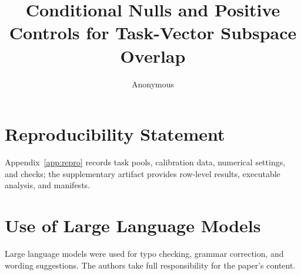 \documentclass{article}
\title{Conditional Nulls and Positive Controls for Task-Vector Subspace Overlap}
\author{Anonymous}
\begin{document}
\maketitle







\section*{Reproducibility Statement}
Appendix~\ref{app:repro} records task pools, calibration data, numerical settings, and checks;
the supplementary artifact provides row-level results, executable analysis, and manifests.
\section*{Use of Large Language Models}
Large language models were used for typo checking, grammar correction, and wording suggestions.
The authors take full responsibility for the paper's content.



\appendix

\end{document}
